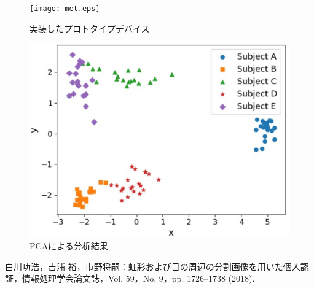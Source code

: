 \documentclass[a4j]{jarticle}%
\begin{document}
\begin{figure}[!t]
  \begin{center}
    \texttt{[image: met.eps]}
  \end{center}
    \vspace{-8mm} 
  \caption{実装したプロトタイプデバイス}
  \label{device}
\end{figure}

\begin{figure}[!t]
  \begin{center}
    \includegraphics[width=1\linewidth]{PCA.eps}
  \end{center}
    \vspace{-8mm} 
  \caption{PCAによる分析結果}
  \label{pca}
\end{figure}

\begin{thebibliography}{2}
  白川功浩，吉浦 裕，市野将嗣：虹彩および目の周辺の分割画像を用いた個人認証，情報処理学会論文誌，Vol. 59，No. 9，pp. 1726--1738 (2018).
 \end{thebibliography}
\end{document}
